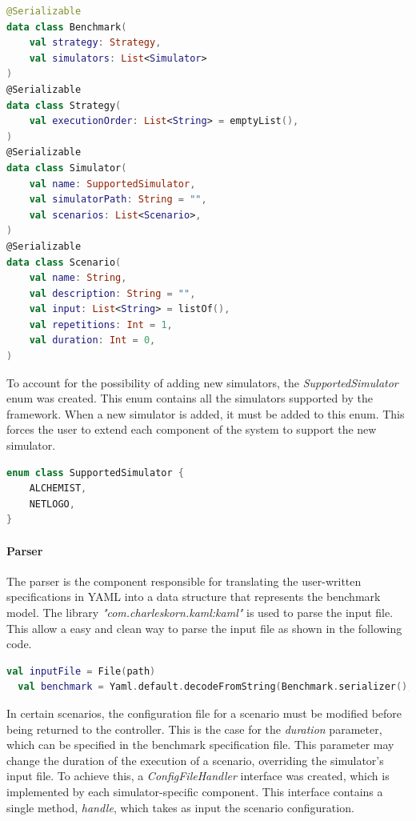 \documentclass[12pt,a4paper,openright,twoside]{book}
\begin{document}
\begin{lstlisting}[language=kt]
@Serializable
data class Benchmark(
    val strategy: Strategy,
    val simulators: List<Simulator>
)
@Serializable
data class Strategy(
    val executionOrder: List<String> = emptyList(),
)
@Serializable
data class Simulator(
    val name: SupportedSimulator,
    val simulatorPath: String = "",
    val scenarios: List<Scenario>,
)
@Serializable
data class Scenario(
    val name: String,
    val description: String = "",
    val input: List<String> = listOf(),
    val repetitions: Int = 1,
    val duration: Int = 0,
)
\end{lstlisting}

To account for the possibility of adding new simulators, the \emph{SupportedSimulator} enum was created.
This enum contains all the simulators supported by the framework. When a new simulator is added, it must be added to this enum.
This forces the user to extend each component of the system to support the new simulator.

\begin{lstlisting}[language=kt]
  enum class SupportedSimulator {
    ALCHEMIST,
    NETLOGO,
}
\end{lstlisting}

\paragraph*{Parser}
The parser is the component responsible for translating the user-written specifications in YAML into a data structure that represents the benchmark model.
The library \emph{"com.charleskorn.kaml:kaml"} is used to parse the input file.
This allow a easy and clean way to parse the input file as shown in the following code.

\begin{lstlisting}[language=kt]
  val inputFile = File(path)
  val benchmark = Yaml.default.decodeFromString(Benchmark.serializer(), inputFile.readText())
\end{lstlisting}

In certain scenarios, the configuration file for a scenario must be modified before being returned to the controller.
This is the case for the \emph{duration} parameter, which can be specified in the benchmark specification file.
This parameter may change the duration of the execution of a scenario, overriding the simulator's input file. 
To achieve this, a \emph{ConfigFileHandler} interface was created, which is implemented by each simulator-specific component.
This interface contains a single method, \emph{handle}, which takes as input the scenario configuration.
\end{document}

